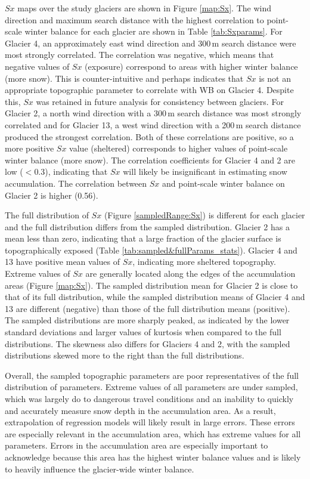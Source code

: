 \documentclass{sfuthesis}
\begin{document}
{$Sx$ maps over the study glaciers are shown in Figure \ref{map:Sx}. The wind direction and maximum search distance with the highest correlation to point-scale winter balance for each glacier are shown in Table \ref{tab:Sxparams}. For Glacier 4, an approximately east wind direction and 300\,m search distance were most strongly correlated. The correlation was negative, which means that negative values of $Sx$ (exposure) correspond to areas with higher winter balance (more snow). This is counter-intuitive and perhaps indicates that $Sx$ is not an appropriate topographic parameter to correlate with WB on Glacier 4. Despite this, $Sx$ was retained in future analysis for consistency between glaciers. For Glacier 2, a north wind direction with a 300\,m search distance was most strongly correlated and for Glacier 13, a west wind direction with a 200\,m search distance produced the strongest correlation. Both of these correlations are positive, so a more positive $Sx$ value (sheltered) corresponds to higher values of point-scale winter balance (more snow). The correlation coefficients for Glacier 4 and 2 are low ($<$0.3), indicating that $Sx$ will likely be insignificant in estimating snow accumulation. The correlation between $Sx$ and point-scale winter balance on Glacier 2 is higher (0.56). 

The full distribution of $Sx$ (Figure \ref{sampledRange:Sx}) is different for each glacier and the full distribution differs from the sampled distribution. Glacier 2 has a mean less than zero, indicating that a large fraction of the glacier surface is topographically exposed (Table \ref{tab:sampled&fullParams_stats}). Glacier 4 and 13 have positive mean values of $Sx$, indicating more sheltered topography. Extreme values of $Sx$ are generally located along the edges of the accumulation areas (Figure \ref{map:Sx}). The sampled distribution mean for Glacier 2 is close to that of its full distribution, while the sampled distribution means of Glacier 4 and 13 are different (negative) than those of the full distribution means (positive). The sampled distributions are more sharply peaked, as indicated by the lower standard deviations and larger values of kurtosis when compared to the full distributions. The skewness also differs for Glaciers 4 and 2, with the sampled distributions skewed more to the right than the full distributions. 

Overall, the sampled topographic parameters are poor representatives of the full distribution of parameters. Extreme values of all parameters are under sampled, which was largely do to dangerous travel conditions and an inability to quickly and accurately measure snow depth in the accumulation area. As a result, extrapolation of regression models will likely result in large errors. These errors are especially relevant in the accumulation area, which has extreme values for all parameters. Errors in the accumulation area are especially important to acknowledge because this area has the highest winter balance values and is likely to heavily influence the glacier-wide winter balance. 

}
\end{document}
